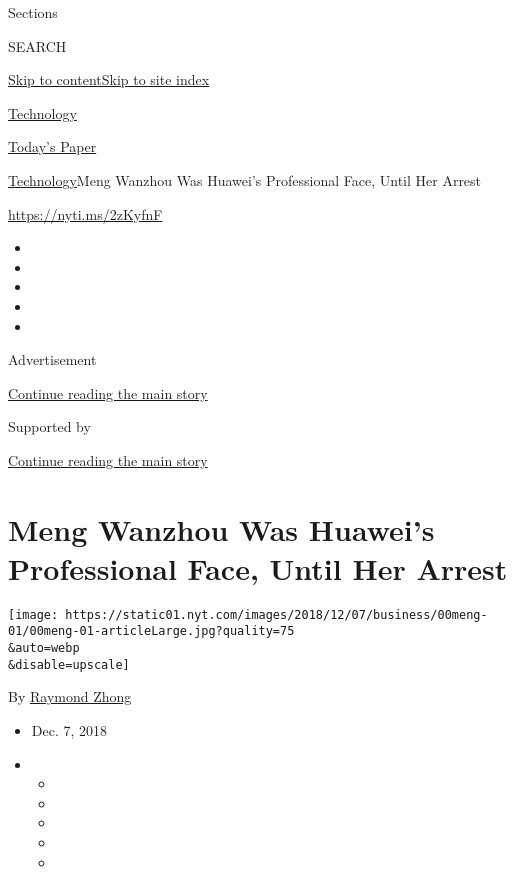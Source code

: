 Sections

SEARCH

\protect\hyperlink{site-content}{Skip to
content}\protect\hyperlink{site-index}{Skip to site index}

\href{https://www.nytimes.com/section/technology}{Technology}

\href{https://myaccount.nytimes.com/auth/login?response_type=cookie\&client_id=vi}{}

\href{https://www.nytimes.com/section/todayspaper}{Today's Paper}

\href{/section/technology}{Technology}\textbar{}Meng Wanzhou Was
Huawei's Professional Face, Until Her Arrest

\url{https://nyti.ms/2zKyfnF}

\begin{itemize}
\item
\item
\item
\item
\item
\end{itemize}

Advertisement

\protect\hyperlink{after-top}{Continue reading the main story}

Supported by

\protect\hyperlink{after-sponsor}{Continue reading the main story}

\hypertarget{meng-wanzhou-was-huaweis-professional-face-until-her-arrest}{%
\section{Meng Wanzhou Was Huawei's Professional Face, Until Her
Arrest}\label{meng-wanzhou-was-huaweis-professional-face-until-her-arrest}}

\texttt{[image: https://static01.nyt.com/images/2018/12/07/business/00meng-01/00meng-01-articleLarge.jpg?quality=75\\\&auto=webp\\\&disable=upscale]}

By \href{https://www.nytimes.com/by/raymond-zhong}{Raymond Zhong}

\begin{itemize}
\item
  Dec. 7, 2018
\item
  \begin{itemize}
  \item
  \item
  \item
  \item
  \item
  \end{itemize}
\end{itemize}


